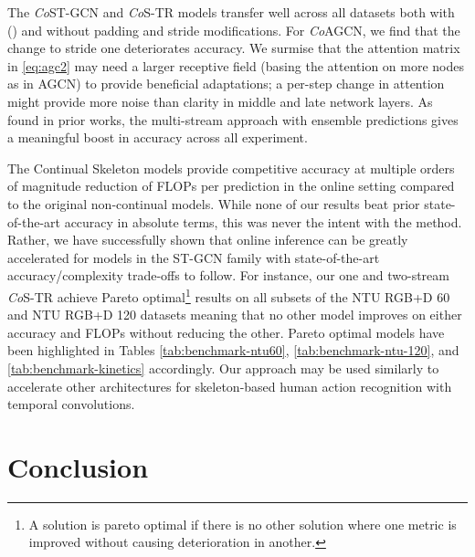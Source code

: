 \documentclass[journal]{IEEEtran}
\theoremstyle{definition}
\begin{document}
The \textit{Co}ST-GCN and \textit{Co}S-TR models transfer well across all datasets both with () and without padding and stride modifications. For \textit{Co}AGCN, we find that the change to stride one deteriorates accuracy. We surmise that the attention matrix in \cref{eq:agc2} may need a larger receptive field (basing the attention on more nodes as in AGCN) to provide beneficial adaptations; a per-step change in attention might provide more noise than clarity in middle and late network layers.
As found in prior works, the multi-stream approach with ensemble predictions gives a meaningful boost in accuracy across all experiment. 

The Continual Skeleton models provide competitive accuracy at multiple orders of magnitude reduction of FLOPs per prediction in the online setting compared to the original non-continual models. While none of our results beat prior state-of-the-art accuracy in absolute terms, this was never the intent with the method. Rather, we have successfully shown that online inference can be greatly accelerated for models in the ST-GCN family with state-of-the-art accuracy/complexity trade-offs to follow. 
For instance, our one and two-stream \textit{Co}S-TR achieve Pareto optimal\footnote{A solution is pareto optimal if there is no other solution where one metric is improved without causing deterioration in another.} results on all subsets of the NTU RGB+D 60 and NTU RGB+D 120 datasets meaning that no other model improves on either accuracy and FLOPs without reducing the other. Pareto optimal models have been highlighted in Tables \ref{tab:benchmark-ntu60}, \ref{tab:benchmark-ntu-120}, and \ref{tab:benchmark-kinetics} accordingly.
Our approach may be used similarly to accelerate other architectures for skeleton-based human action recognition with temporal convolutions.



\section{Conclusion} \label{sec:conclusion}
\end{document}
